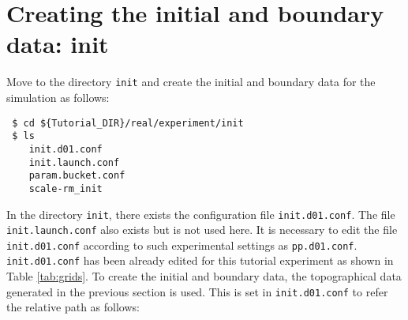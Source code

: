 \section{Creating the initial and boundary data: init} \label{sec:tutorial_real_init}

Move to the directory \verb|init| and create the initial and boundary data for the \scalerm simulation as follows:
\begin{verbatim}
 $ cd ${Tutorial_DIR}/real/experiment/init
 $ ls
    init.d01.conf
    init.launch.conf
    param.bucket.conf
    scale-rm_init
\end{verbatim}

In the directory \verb|init|, there exists the configuration file \verb|init.d01.conf|.
The file \verb|init.launch.conf| also exists but is not used here.
It is necessary to edit the file \verb|init.d01.conf| according to such experimental settings as \verb|pp.d01.conf|. \verb|init.d01.conf| has been already edited for this tutorial experiment as shown in Table \ref{tab:grids}.  To create the initial and boundary data,  the topographical data generated in the previous section is used. This is set in \verb|init.d01.conf| to refer the relative path as follows:

